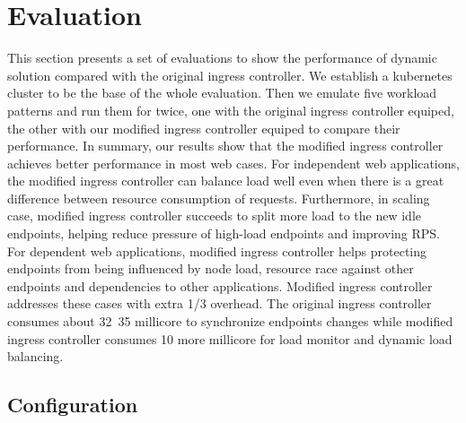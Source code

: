 \section{Evaluation}
\label{sec:evaluation}
This section presents a set of evaluations to show the performance of dynamic solution
compared with the original ingress controller. We establish a kubernetes cluster to be the base of the whole evaluation. Then we emulate five workload patterns and run them for twice, one with the original ingress controller equiped,
the other with our modified ingress controller equiped to compare their performance.
In summary, our results show that the modified ingress controller achieves better performance in most web cases. For
independent web applications, the modified ingress controller can balance load well even when there is a great difference between resource consumption of requests. Furthermore, in scaling case,
modified ingress controller succeeds to split more load to the new idle endpoints, helping reduce pressure of high-load endpoints and improving RPS. For dependent web applications, modified
ingress controller helps protecting endpoints from being influenced by node load, resource race against other endpoints and dependencies to other applications. Modified ingress controller
addresses these cases with extra 1/3 overhead. The original ingress controller consumes about 32~35 millicore to synchronize endpoints changes while modified ingress controller consumes 10 more
millicore for load monitor and dynamic load balancing.

\subsection{Configuration}

